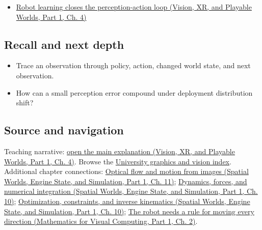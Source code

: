 \begin{itemize}
\tightlist
\item
  \href{../07-Vision-XR-and-Playable-Worlds-P01/main.pdf\#04-visual-computing-ii-ch034-robot-learning-closes-the-perception-action-loop}{Robot learning closes the perception-action loop (Vision, XR, and Playable Worlds, Part 1, Ch. 4)}
\end{itemize}

\subsection{Recall and next depth}\label{appendix-b0c42da325f1-recall-and-next-depth}

\hypertarget{appendix-b0c42da325f1-recall-and-next-depth}{}

\begin{itemize}
\tightlist
\item
  Trace an observation through policy, action, changed world state, and next observation.
\item
  How can a small perception error compound under deployment distribution shift?
\end{itemize}

\subsection{Source and navigation}\label{appendix-b0c42da325f1-source-and-navigation}

\hypertarget{appendix-b0c42da325f1-source-and-navigation}{}

Teaching narrative: \href{../07-Vision-XR-and-Playable-Worlds-P01/main.pdf\#04-visual-computing-ii-ch034-robot-learning-closes-the-perception-action-loop}{open the main explanation (Vision, XR, and Playable Worlds, Part 1, Ch. 4)}. Browse the \hyperref[appendix-a6d556a4ef50-university-graphics-vision-and-photography---independent-series]{University graphics and vision index}. Additional chapter connections: \href{../05-Spatial-Worlds-Engine-State-and-Simulation-P01/main.pdf\#04-visual-computing-ii-ch030-optical-flow-and-motion-from-images}{Optical flow and motion from images (Spatial Worlds, Engine State, and Simulation, Part 1, Ch. 11)}; \href{../05-Spatial-Worlds-Engine-State-and-Simulation-P01/main.pdf\#04-visual-computing-ii-ch029-dynamics-forces-and-numerical-integration}{Dynamics, forces, and numerical integration (Spatial Worlds, Engine State, and Simulation, Part 1, Ch. 10)}; \href{../05-Spatial-Worlds-Engine-State-and-Simulation-P01/main.pdf\#04-visual-computing-ii-ch029-optimization-constraints-and-inverse-kinematics}{Optimization, constraints, and inverse kinematics (Spatial Worlds, Engine State, and Simulation, Part 1, Ch. 10)}; \href{../02-Mathematics-for-Visual-Computing-P01/main.pdf\#01-foundations-i-ch018-the-robot-needs-a-rule-for-moving-every-direction}{The robot needs a rule for moving every direction (Mathematics for Visual Computing, Part 1, Ch. 2)}.

